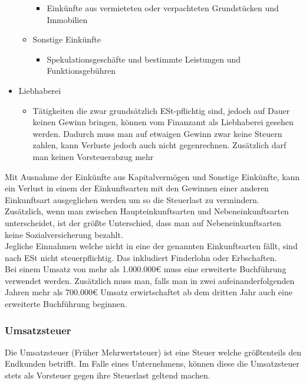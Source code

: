 \documentclass{article}
\begin{document}
\begin{itemize}
\begin{itemize}
				\begin{itemize}
					\item{Einkünfte aus vermieteten oder verpachteten Grundstücken und Immobilien}
				\end{itemize}
				\item{Sonstige Einkünfte}
				\begin{itemize}
					\item{Spekulationsgeschäfte und bestimmte Leistungen und Funktionsgebühren}
				\end{itemize}
			\end{itemize}
			\item{Liebhaberei}
			\begin{itemize}
				\item{Tätigkeiten die zwar grundsätzlich ESt-pflichtig sind, jedoch auf Dauer keinen Gewinn bringen, können vom Finanzamt als Liebhaberei gesehen werden. Dadurch muss man auf etwaigen Gewinn zwar keine Steuern zahlen, kann Verluste jedoch auch nicht gegenrechnen. Zusätzlich darf man keinen Vorsteuerabzug mehr}
			\end{itemize}
	\end{itemize}
	Mit Ausnahme der Einkünfte aus Kapitalvermögen und Sonstige Einkünfte, kann ein Verlust in einem der Einkunftsarten mit den Gewinnen einer anderen Einkunftsart ausgeglichen werden um so die Steuerlast zu vermindern. \\
	Zusätzlich, wenn man zwischen Haupteinkunftsarten und Nebeneinkunftsarten unterscheidet, ist der größte Unterschied, dass man auf Nebeneinkunftsarten keine Sozialversicherung bezahlt. \\
	Jegliche Einnahmen welche nicht in eine der genannten Einkunftsarten fällt, sind nach ESt nicht steuerpflichtig. Das inkludiert Finderlohn oder Erbschaften. \\
	Bei einem Umsatz von mehr als 1.000.000€ muss eine erweiterte Buchführung verwendet werden. Zusätzlich muss man, falls man in zwei aufeinanderfolgenden Jahren mehr als 700.000€ Umsatz erwirtschaftet ab dem dritten Jahr auch eine erweiterte Buchführung beginnen.
	\subsubsection{Umsatzsteuer}
	Die Umsatzsteuer (Früher Mehrwertsteuer) ist eine Steuer welche größtenteils den Endkunden betrifft. Im Falle eines Unternehmens, können diese die Umsatzsteuer stets als Vorsteuer gegen ihre Steuerlast geltend machen.
\end{document}

